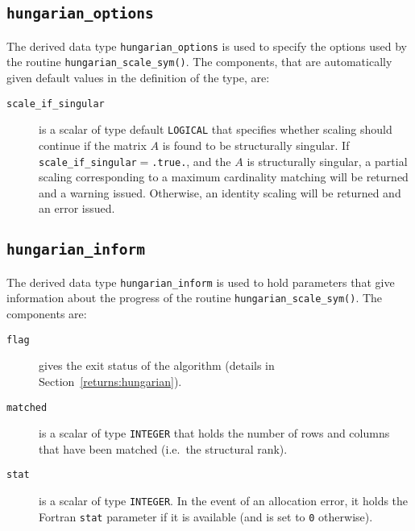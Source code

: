 \subsection{\texttt{hungarian\_options}} \label{type:hungarian_options}

The derived data type \texttt{hungarian\_options} is used to specify the
options used by the routine \texttt{hungarian\_scale\_sym()}. The components,
that are automatically given default values in the definition of the type, are:

\begin{description}

\item[\texttt{scale\_if\_singular}] is a scalar of type default \texttt{LOGICAL}
that specifies whether scaling should continue if the matrix $A$ is found to be
structurally singular. If \texttt{scale\_if\_singular}$=$\texttt{.true.},
and the $A$ is structurally singular, a partial scaling corresponding to a
maximum cardinality matching will be returned and a warning issued. Otherwise,
an identity scaling will be returned and an error issued.

\end{description}

\subsection{\texttt{hungarian\_inform}} \label{type:hungarian_inform}

The derived data type \texttt{hungarian\_inform} is used to hold parameters
that give information about the progress of the routine
\texttt{hungarian\_scale\_sym()}. The components are:

\begin{description}

\item[\texttt{flag}] gives the exit status of the algorithm (details in Section~\ref{returns:hungarian}).

\item[\texttt{matched}] is a scalar of type \texttt{INTEGER} that holds the number of rows and columns that have been matched (i.e.~the structural rank).

\item[\texttt{stat}] is a scalar of type \texttt{INTEGER}. In the event of an allocation error, it holds the Fortran \texttt{stat} parameter if it is available (and is set to \texttt{0} otherwise).
\end{description}

